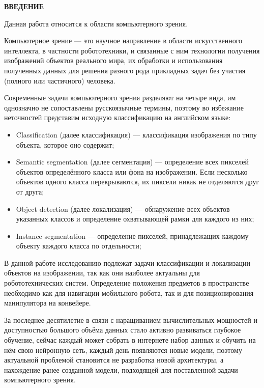 \newpage
\begin{center}
	\textbf{ВВЕДЕНИЕ}
\end{center}

Данная работа относится к области компьютерного зрения.

Компьютерное зрение — это научное направление в области искусственного интеллекта, в частности робототехники, и связанные с ним технологии получения изображений объектов реального мира, их обработки и использования полученных данных для решения разного рода прикладных задач без участия (полного или частичного) человека.

Современные задачи компьютерного зрения разделяют на четыре вида, им однозначно не сопоставлены русскоязычные термины, поэтому во избежание неточностей представим исходную классификацию на английском языке:

\begin{itemize}
	\item Classification (далее классификация) — классификация изображения по типу объекта, которое оно содержит;
	\item Semantic segmentation (далее сегментация) — определение всех пикселей объектов определённого класса или фона на изображении. Если несколько объектов одного класса перекрываются, их пиксели никак не отделяются друг от друга;
	\item Object detection (далее локализация) — обнаружение всех объектов указанных классов и определение охватывающей рамки для каждого из них;
	\item Instance segmentation — определение пикселей, принадлежащих каждому объекту каждого класса по отдельности;
\end{itemize}

В данной работе исследованию подлежат задачи классификации и локализации объектов на изображении, так как они наиболее актуальны для робототехнических систем. Определение положения предметов в пространстве необходимо как для навигации мобильного робота, так и для позиционирования манипулятора на конвейере. 

За последнее десятилетие в связи с наращиванием вычислительных мощностей и доступностью большого объёма данных стало активно развиваться глубокое обучение, сейчас каждый может собрать в интернете набор данных и обучить на нём свою нейронную сеть, каждый день появляются новые модели, поэтому актуальной проблемой становится не разработка новой архитектуры, а нахождение ранее созданной модели, подходящей для поставленной задачи компьютерного зрения.

